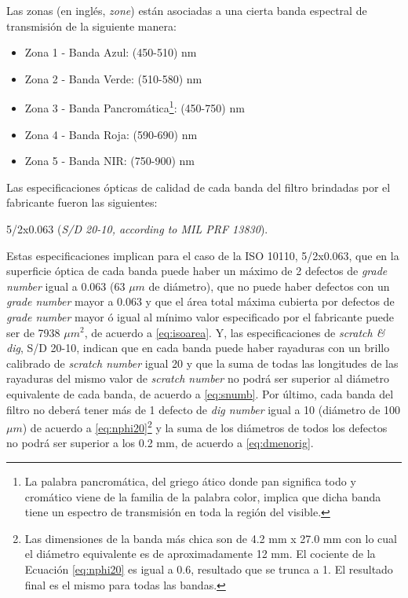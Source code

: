 Las zonas (en inglés, \textit{zone}) están asociadas a una cierta banda espectral de transmisión de la siguiente manera:
\begin{itemize}
\justifying
\item Zona 1 - Banda Azul: (450-510) nm
\item Zona 2 - Banda Verde: (510-580) nm
\item Zona 3 - Banda Pancromática\footnote{La palabra pancromática, del griego ático donde pan significa todo y cromático viene de la familia de la palabra color, implica que dicha banda tiene un espectro de transmisión en toda la región del visible.}: (450-750) nm
\item Zona 4 - Banda Roja: (590-690) nm
\item Zona 5 - Banda NIR: (750-900) nm
\end{itemize}
 \hspace{0.5cm}Las especificaciones ópticas de calidad de cada banda del filtro brindadas por el fabricante fueron las siguientes:
\begin{center}
5/2x0.063 (\textit{S/D 20-10, according to MIL PRF 13830}).
\end{center}
\hspace{0.5cm}Estas especificaciones implican para el caso de la ISO 10110, 5/2x0.063, que en la superficie óptica de cada banda puede haber un máximo de 2 defectos de \textit{grade number} igual a 0.063 (63 $\mu m$ de diámetro), que no puede haber defectos con un \textit{grade number} mayor a 0.063 y que el área total máxima cubierta por defectos de \textit{grade number} mayor ó igual al mínimo valor especificado por el fabricante puede ser de 7938 $\mu m^{2}$, de acuerdo a \ref{eq:isoarea}. Y, las especificaciones de \textit{scratch \& dig}, S/D 20-10, indican que en cada banda puede haber rayaduras con un brillo calibrado de \textit{scratch number} igual 20 y que la suma de todas las longitudes de las rayaduras del mismo valor de \textit{scratch number} no podrá ser superior al diámetro equivalente de cada banda, de acuerdo a \ref{eq:snumb}. Por último, cada banda del filtro no deberá tener más de 1 defecto de \textit{dig number} igual a 10 (diámetro de 100 $\mu m$)  de acuerdo a \ref{eq:nphi20}\footnote{Las dimensiones de la banda más chica son de 4.2 mm x 27.0 mm con lo cual el diámetro equivalente es de aproximadamente 12 mm. El cociente de la Ecuación \ref{eq:nphi20} es igual a 0.6, resultado que se trunca a 1. El resultado final es el mismo para todas las bandas.}  y la suma de los diámetros de todos los defectos no podrá ser superior a los 0.2 mm, de acuerdo a \ref{eq:dmenorig}. 

